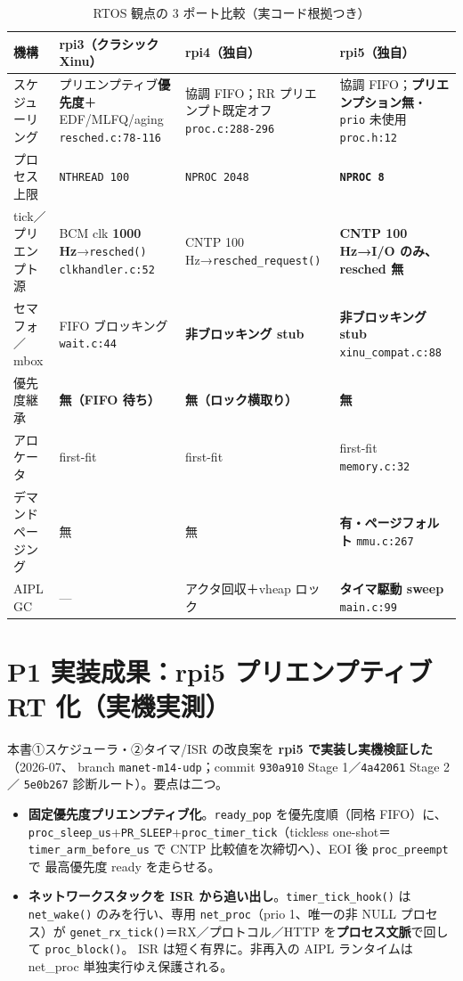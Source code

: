 \documentclass[11pt,a4paper]{article}
\newcommand{\code}[1]{\texttt{\small #1}}
\newcommand{\limt}[1]{\textbf{\textcolor{red!55!black}{#1}}}
\begin{document}
\begin{table}[h]\centering
\caption{RTOS 観点の 3 ポート比較（実コード根拠つき）}\label{tab:summary}
\scriptsize
\begin{tabularx}{\linewidth}{@{}lXXX@{}}
\toprule
機構 & rpi3（クラシック Xinu） & rpi4（独自） & rpi5（独自） \\
\midrule
スケジューリング & プリエンプティブ\textbf{優先度}＋EDF/MLFQ/aging \code{resched.c:78-116} & 協調 FIFO；RR プリエンプト既定オフ \code{proc.c:288-296} & 協調 FIFO；\limt{プリエンプション無}・\code{prio} 未使用 \code{proc.h:12} \\
プロセス上限 & \code{NTHREAD 100} & \code{NPROC 2048} & \limt{\code{NPROC 8}} \\
tick／プリエンプト源 & BCM clk \textbf{1000\,Hz}→\code{resched()} \code{clkhandler.c:52} & CNTP 100\,Hz→\code{resched\_request()} & \limt{CNTP 100\,Hz→I/O のみ、resched 無} \\
セマフォ／mbox & FIFO ブロッキング \code{wait.c:44} & \limt{非ブロッキング stub} & \limt{非ブロッキング stub} \code{xinu\_compat.c:88} \\
優先度継承 & \limt{無（FIFO 待ち）} & \limt{無（ロック横取り）} & \limt{無} \\
アロケータ & first-fit & first-fit & first-fit \code{memory.c:32} \\
デマンドページング & 無 & 無 & \limt{有・ページフォルト} \code{mmu.c:267} \\
AIPL GC & --- & アクタ回収＋vheap ロック & \limt{タイマ駆動 sweep} \code{main.c:99} \\
\bottomrule
\end{tabularx}
\end{table}

\section{P1 実装成果：rpi5 プリエンプティブ RT 化（実機実測）}\label{sec:p1}
本書①スケジューラ・②タイマ/ISR の改良案を \textbf{rpi5 で実装し実機検証した}（2026-07、
branch \code{manet-m14-udp}；commit \code{930a910} Stage 1／\code{4a42061} Stage 2／
\code{5e0b267} 診断ルート）。要点は二つ。
\begin{itemize}\itemsep1pt
\item \textbf{固定優先度プリエンプティブ化}。\code{ready\_pop} を優先度順（同格 FIFO）に、
\code{proc\_sleep\_us}+\code{PR\_SLEEP}+\code{proc\_timer\_tick}（tickless one-shot＝
\code{timer\_arm\_before\_us} で CNTP 比較値を次締切へ）、EOI 後 \code{proc\_preempt} で
最高優先度 ready を走らせる。
\item \textbf{ネットワークスタックを ISR から追い出し}。\code{timer\_tick\_hook()} は
\code{net\_wake()} のみを行い、専用 \code{net\_proc}（prio 1、唯一の非 NULL プロセス）が
\code{genet\_rx\_tick()}＝RX／プロトコル／HTTP を\textbf{プロセス文脈}で回して \code{proc\_block()}。
ISR は短く有界に。非再入の AIPL ランタイムは net\_proc 単独実行ゆえ保護される。
\end{itemize}
\end{document}
